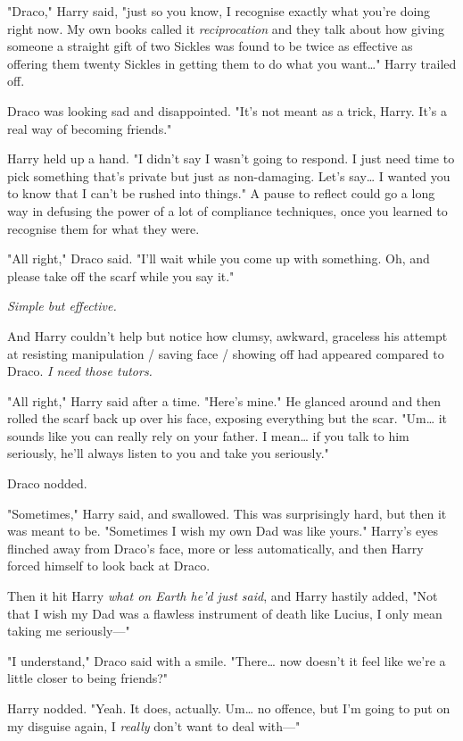 "Draco," Harry said, "just so you know, I recognise exactly what you're doing 
right now. My own books called it \emph{reciprocation} and they talk about how 
giving someone a straight gift of two Sickles was found to be twice as 
effective as offering them twenty Sickles in getting them to do what you 
want{\ldots}" Harry trailed off.

Draco was looking sad and disappointed. "It's not meant as a trick, Harry. It's 
a real way of becoming friends."

Harry held up a hand. "I didn't say I wasn't going to respond. I just need time 
to pick something that's private but just as non-damaging. Let's say{\ldots} I 
wanted you to know that I can't be rushed into things." A pause to reflect 
could go a long way in defusing the power of a lot of compliance techniques, 
once you learned to recognise them for what they were.

"All right," Draco said. "I'll wait while you come up with something. Oh, and 
please take off the scarf while you say it."

\emph{Simple but effective.}

And Harry couldn't help but notice how clumsy, awkward, graceless his attempt 
at resisting manipulation / saving face / showing off had appeared compared to 
Draco. \emph{I need those tutors.}

"All right," Harry said after a time. "Here's mine." He glanced around and then 
rolled the scarf back up over his face, exposing everything but the scar. 
"Um{\ldots} it sounds like you can really rely on your father. I mean{\ldots} 
if you talk to him seriously, he'll always listen to you and take you 
seriously."

Draco nodded.

"Sometimes," Harry said, and swallowed. This was surprisingly hard, but then it 
was meant to be. "Sometimes I wish my own Dad was like yours." Harry's eyes 
flinched away from Draco's face, more or less automatically, and then Harry 
forced himself to look back at Draco.

Then it hit Harry \emph{what on Earth he'd just said}, and Harry hastily added, 
"Not that I wish my Dad was a flawless instrument of death like Lucius, I only 
mean taking me seriously---"

"I understand," Draco said with a smile. "There{\ldots} now doesn't it feel 
like we're a little closer to being friends?"

Harry nodded. "Yeah. It does, actually. Um{\ldots} no offence, but I'm going to 
put on my disguise again, I \emph{really} don't want to deal with---"

